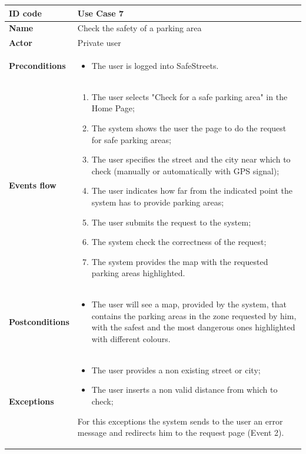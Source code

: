 \documentclass[titlepage]{article}
\begin{document}
\newpage

\begin{longtable}{| p{3 cm} | p{10 cm} |} 
\hline

\textbf{ID code} & Use Case 7 \\ \hline
\textbf{Name} & Check the safety of a parking area \\ \hline
\textbf{Actor} & Private user \\ \hline
\textbf{Preconditions} &
\begin{itemize}
\item The user is logged into SafeStreets.
\end{itemize} \\ \hline

\textbf{Events flow} &
\begin{enumerate}
\item The user selects "Check for a safe parking area" in the Home Page;
\item The system shows the user the page to do the request for safe parking areas;
\item The user specifies the street and the city near which to check (manually or automatically with GPS signal);
\item The user indicates how far from the indicated point the system has to provide parking areas;
\item The user submits the request to the system;
\item The system check the correctness of the request;
\item The system provides the map with the requested parking areas highlighted. 

\end{enumerate} \\ \hline

\textbf{Postconditions} &
\begin{itemize}
\item The user will see a map, provided by the system, that contains the parking areas in the zone requested by him, with the safest and the most dangerous ones highlighted with different colours.
\end{itemize} \\ \hline

\textbf{Exceptions} &
\begin{itemize}
\item The user provides a non existing street or city;
\item The user inserts a non valid distance from which to check;
\end{itemize}
For this exceptions the system sends to the user an error message and redirects him to the request page (Event 2). \\ \hline




\end{longtable}
\end{document}
